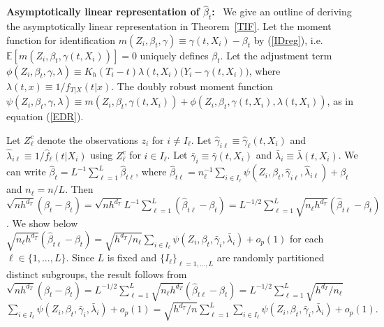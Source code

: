 \documentclass[lettersize, 12pt]{article}
\renewcommand{\thesection}{\arabic{section}}
\renewcommand{\theequation}{\arabic{section}.\arabic{equation}}
\begin{document}
%
%
\textbf{Asymptotically linear representation of $\hat\beta_t$:}\ 
We give an outline of deriving the asymptotically linear representation in Theorem~\ref{TIF}.
Let the moment function for identification $m(Z_i, \beta_t, \gamma) \equiv \gamma(t, X_i) - \beta_t$ by (\ref{IDreg}), i.e.\ $\mathbb{E}[m(Z_i, \beta_t, \gamma(t, X_i))] = 0$ uniquely defines $\beta_t$.
Let the adjustment term $\phi(Z_i, \beta_t, \gamma, \lambda) \equiv
K_h(T_i - t) \lambda(t, X_i) \big( Y_i - \gamma(t, X_i) \big)$, where $\lambda(t,x) \equiv 1/f_{T|X}(t|x)$.
The doubly robust moment function $\psi(Z_i, \beta_t, \gamma, \lambda) \equiv m(Z_i, \beta_t, \gamma(t, X_i)) + \phi(Z_i, \beta_t, \gamma(t, X_i), \lambda(t, X_i))$, as in equation (\ref{EDR}).

Let $Z_\ell^c$ denote the observations $z_i$ for $i \neq I_\ell$.
Let  $\hat \gamma_{i\ell} \equiv \hat \gamma_\ell(t, X_i)$ 
and $\hat\lambda_{i\ell} \equiv 1/\hat f_{\ell}(t|X_i)$ using $Z_\ell^c$ for $i \in I_\ell$.
Let $\bar \gamma_i \equiv \bar \gamma(t, X_i)$ and $\bar \lambda_i \equiv \bar \lambda(t, X_i)$.
We can write $\hat \beta_t = L^{-1}\sum_{\ell=1}^L \hat \beta_{t\ell}$, where $\hat \beta_{t\ell} = n_\ell^{-1}\sum_{i\in I_\ell}  \psi(Z_i, \beta_t, \hat \gamma_{i\ell}, \hat \lambda_{i\ell}) + \beta_t$ and $n_\ell = n/L$.
Then 
$\sqrt{nh^{d_T}}(\hat\beta_t - \beta_t) 
= \sqrt{nh^{d_T}} L^{-1}\sum_{\ell=1}^L (\hat \beta_{t\ell}- \beta_t)
=  L^{-1/2} \sum_{\ell=1}^L  \sqrt{n_\ell h^{d_T}}(\hat \beta_{t\ell}- \beta_t)$.
We show below $\sqrt{n_\ell h^{d_T}}(\hat \beta_{t\ell}- \beta_t) = 
\sqrt{h^{d_T}/n_\ell}\sum_{i \in I_\ell} \psi(Z_i, \beta_t, \bar \gamma_i, \bar \lambda_i) + o_p(1)
$ for each $\ell\in\{1,...,L\}$.
Since $L$ is fixed and $\{I_\ell\}_{\ell=1,...,L}$ are randomly partitioned distinct subgroups, the result follows from $\sqrt{nh^{d_T}}(\hat\beta_t - \beta_t) =
L^{-1/2} \sum_{\ell=1}^L  \sqrt{n_\ell h^{d_T}}(\hat \beta_{t\ell}- \beta_t)
= 
L^{-1/2} \sum_{\ell=1}^L  \sqrt{h^{d_T}/n_\ell}
$\\$\sum_{i \in I_\ell} 
\psi(Z_i, \beta_t, \bar \gamma_i, \bar  \lambda_i) + o_p(1)
= 
\sqrt{h^{d_T}/n}  \sum_{\ell=1}^L \sum_{i \in I_\ell} \psi(Z_i, \beta_t, \bar \gamma_i,\bar  \lambda_i) + o_p(1).$
\end{document}
